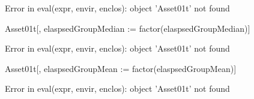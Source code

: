 \begin{Schunk}
\begin{Sinput}
\end{Sinput}
\begin{Soutput}
Error in eval(expr, envir, enclos): object 'Asset01t' not found
\end{Soutput}
\begin{Sinput}
Asset01t[, elaspsedGroupMedian := factor(elaspsedGroupMedian)]
\end{Sinput}
\begin{Soutput}
Error in eval(expr, envir, enclos): object 'Asset01t' not found
\end{Soutput}
\begin{Sinput}
Asset01t[, elaspsedGroupMean := factor(elaspsedGroupMean)]
\end{Sinput}
\begin{Soutput}
Error in eval(expr, envir, enclos): object 'Asset01t' not found
\end{Soutput}
\end{Schunk}
